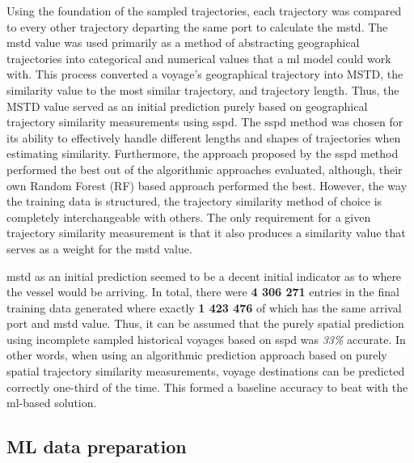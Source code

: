 Using the foundation of the sampled trajectories, each trajectory was compared to every other trajectory departing the same port to calculate the \acrfull{mstd}. The \acrshort{mstd} value was used primarily as a method of abstracting geographical trajectories into categorical and numerical values that a \acrfull{ml} model could work with. This process converted a voyage's geographical trajectory into MSTD, the similarity value to the most similar trajectory, and trajectory length. Thus, the MSTD value served as an initial prediction purely based on geographical trajectory similarity measurements using \acrfull{sspd}. The \acrshort{sspd} method was chosen for its ability to effectively handle different lengths and shapes of trajectories when estimating similarity. Furthermore, the approach proposed by \cite{Zhang2020AISApproach} the \acrshort{sspd} method performed the best out of the algorithmic approaches evaluated, although, their own Random Forest (RF) based approach performed the best. However, the way the training data is structured, the trajectory similarity method of choice is completely interchangeable with others. The only requirement for a given trajectory similarity measurement is that it also produces a similarity value that serves as a weight for the \acrshort{mstd} value.

\acrshort{mstd} as an initial prediction seemed to be a decent initial indicator as to where the vessel would be arriving. In total, there were \textbf{4 306 271} entries in the final training data generated where exactly \textbf{1 423 476} of which has the same arrival port and \acrshort{mstd} value. Thus, it can be assumed that the purely spatial prediction using incomplete sampled historical voyages based on \acrshort{sspd} was \textit{33\%} accurate. In other words, when using an algorithmic prediction approach based on purely spatial trajectory similarity measurements, voyage destinations can be predicted correctly one-third of the time. This formed a baseline accuracy to beat with the \acrshort{ml}-based solution.

\subsection{ML data preparation}

